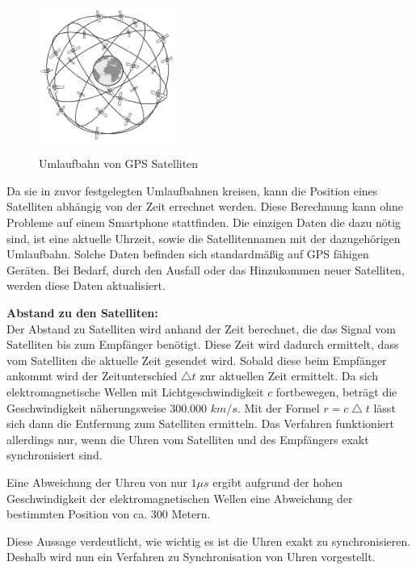 \begin{figure}[h]
\centering
\includegraphics[width=0.4\textwidth]{ref/images/GPS_Umlaufbahn.PNG}
\caption[Umlaufbahn von GPS Satelliten]{Umlaufbahn von GPS Satelliten}
\label{fig:Umlaufbahn Satelliten}
\cite[S. 164]{Kuepper2005}
\end{figure}

Da sie in zuvor festgelegten Umlaufbahnen kreisen, kann die Position eines Satelliten abhängig von der Zeit errechnet werden. 
Diese Berechnung kann ohne Probleme auf einem Smartphone stattfinden. Die einzigen Daten die dazu nötig sind, ist eine aktuelle Uhrzeit, sowie die Satellitennamen mit der dazugehörigen Umlaufbahn. Solche Daten befinden sich standardmäßig auf GPS fähigen Geräten. Bei Bedarf, durch den Ausfall oder das Hinzukommen neuer Satelliten, werden diese Daten aktualisiert.
\cite[S. 189]{Schiller2004}


\textbf{Abstand zu den Satelliten:}\\
Der Abstand zu Satelliten wird anhand der Zeit berechnet, die das Signal vom Satelliten bis zum Empfänger benötigt. Diese Zeit wird dadurch ermittelt, dass vom Satelliten die aktuelle Zeit gesendet wird. Sobald diese beim Empfänger ankommt wird der Zeitunterschied $ \bigtriangleup t $ zur aktuellen Zeit ermittelt. Da sich elektromagnetische Wellen mit Lichtgeschwindigkeit $ c $ fortbewegen, beträgt die Geschwindigkeit näherungsweise 300.000 $km/s$. Mit der Formel $ r = c \bigtriangleup t$ lässt sich dann die Entfernung zum Satelliten ermitteln. Das Verfahren funktioniert allerdings nur, wenn die Uhren vom Satelliten und des Empfängers exakt synchronisiert sind. 
\cite[S. 189]{Schiller2004}

Eine Abweichung der Uhren von nur $1\mu s$ ergibt aufgrund der hohen Geschwindigkeit der elektromagnetischen Wellen eine Abweichung der bestimmten Position von ca. 300 Metern.
\cite[S. 189]{Schiller2004}

Diese Aussage verdeutlicht, wie wichtig es ist die Uhren exakt zu synchronisieren. Deshalb wird nun ein Verfahren zu Synchronisation von Uhren vorgestellt.


